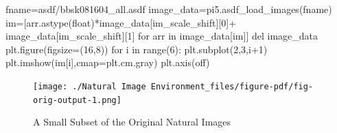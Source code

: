\documentclass[
  letterpaper,
  number]{elsarticle}
\newenvironment{Shaded}{\begin{snugshade}}{\end{snugshade}}
\newcommand{\BuiltInTok}[1]{\textcolor[rgb]{0.00,0.23,0.31}{#1}}
\newcommand{\ControlFlowTok}[1]{\textcolor[rgb]{0.00,0.23,0.31}{#1}}
\newcommand{\DecValTok}[1]{\textcolor[rgb]{0.68,0.00,0.00}{#1}}
\newcommand{\KeywordTok}[1]{\textcolor[rgb]{0.00,0.23,0.31}{#1}}
\newcommand{\NormalTok}[1]{\textcolor[rgb]{0.00,0.23,0.31}{#1}}
\newcommand{\OperatorTok}[1]{\textcolor[rgb]{0.37,0.37,0.37}{#1}}
\newcommand{\StringTok}[1]{\textcolor[rgb]{0.13,0.47,0.30}{#1}}
\begin{document}
\begin{Shaded}
\begin{Highlighting}[]
\NormalTok{fname}\OperatorTok{=}\StringTok{\textquotesingle{}asdf/bbsk081604\_all.asdf\textquotesingle{}}
\NormalTok{image\_data}\OperatorTok{=}\NormalTok{pi5.asdf\_load\_images(fname)}
\NormalTok{im}\OperatorTok{=}\NormalTok{[arr.astype(}\BuiltInTok{float}\NormalTok{)}\OperatorTok{*}\NormalTok{image\_data[}\StringTok{\textquotesingle{}im\_scale\_shift\textquotesingle{}}\NormalTok{][}\DecValTok{0}\NormalTok{]}\OperatorTok{+}
\NormalTok{        image\_data[}\StringTok{\textquotesingle{}im\_scale\_shift\textquotesingle{}}\NormalTok{][}\DecValTok{1}\NormalTok{] }\ControlFlowTok{for}\NormalTok{ arr }\KeywordTok{in}\NormalTok{ image\_data[}\StringTok{\textquotesingle{}im\textquotesingle{}}\NormalTok{]]}
\KeywordTok{del}\NormalTok{ image\_data}
\NormalTok{plt.figure(figsize}\OperatorTok{=}\NormalTok{(}\DecValTok{16}\NormalTok{,}\DecValTok{8}\NormalTok{))}
\ControlFlowTok{for}\NormalTok{ i }\KeywordTok{in} \BuiltInTok{range}\NormalTok{(}\DecValTok{6}\NormalTok{):}
\NormalTok{    plt.subplot(}\DecValTok{2}\NormalTok{,}\DecValTok{3}\NormalTok{,i}\OperatorTok{+}\DecValTok{1}\NormalTok{)}
\NormalTok{    plt.imshow(im[i],cmap}\OperatorTok{=}\NormalTok{plt.cm.gray)}
\NormalTok{    plt.axis(}\StringTok{\textquotesingle{}off\textquotesingle{}}\NormalTok{)}
\end{Highlighting}
\end{Shaded}

\begin{figure}[H]

{\centering \texttt{[image: ./Natural Image Environment\_files/figure-pdf/fig-orig-output-1.png]}

}

\caption{\label{fig-orig}A Small Subset of the Original Natural Images}

\end{figure}
\end{document}
